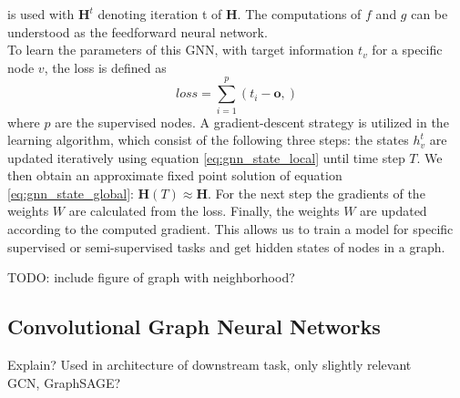 is used with $\mathbf{H}^t$ denoting iteration t of $\mathbf{H}$. The computations of $f$ and $g$ can be understood as the feedforward neural network. \\
To learn the parameters of this GNN, with target information $t_v$ for a specific node $v$, the loss is defined as
\begin{equation}
    loss = \sum_{i=1}^p (t_i-\mathbf{o},)
\end{equation}
where $p$ are the supervised nodes. A gradient-descent strategy is utilized in the learning algorithm, which consist of the following three steps: the states $h_v^t$ are updated iteratively using equation \eqref{eq:gnn_state_local} until time step $T$. We then obtain an approximate fixed point solution of equation \eqref{eq:gnn_state_global}: $\mathbf{H}(T)\approx\mathbf{H}$. For the next step the gradients of the weights $W$ are calculated from the loss. Finally, the weights $W$ are updated according to the computed gradient. This allows us to train a model for specific supervised or semi-supervised tasks and get hidden states of nodes in a graph. \bigskip

TODO: include figure of graph with neighborhood?
\subsection{Convolutional Graph Neural Networks}
Explain? Used in architecture of downstream task, only slightly relevant \\
GCN, GraphSAGE?

